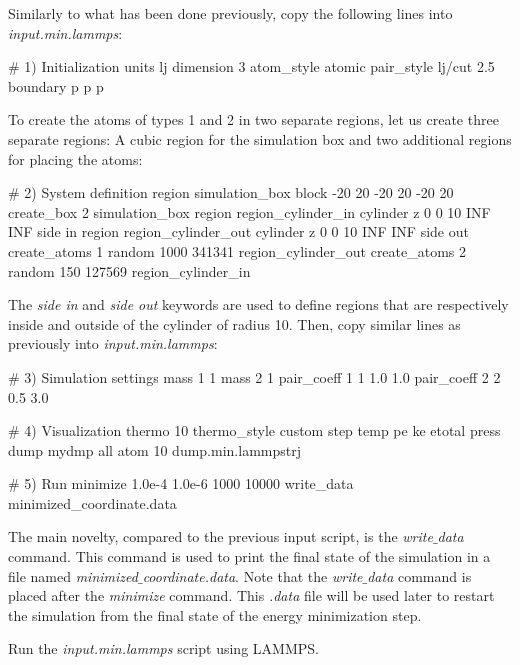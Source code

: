 \vspace{0.25cm} \noindent Similarly to what has been done previously, copy the following lines
into \textit{input.min.lammps}:

\begin{lcverbatim}
# 1) Initialization
units lj
dimension 3
atom_style atomic
pair_style lj/cut 2.5
boundary p p p
\end{lcverbatim}

\noindent To create the atoms of types 1 and 2 in two separate
regions, let us create three separate regions: A cubic region
for the simulation box and two additional regions for placing the atoms:

\begin{lcverbatim}
# 2) System definition
region simulation_box block -20 20 -20 20 -20 20
create_box 2 simulation_box
region region_cylinder_in cylinder z 0 0 10 INF INF side in
region region_cylinder_out cylinder z 0 0 10 INF INF side out
create_atoms 1 random 1000 341341 region_cylinder_out
create_atoms 2 random 150 127569 region_cylinder_in
\end{lcverbatim}

\noindent The \textit{side in} and \textit{side out} keywords
are used to define regions that are respectively inside
and outside of the cylinder of radius 10. Then, copy similar lines
as previously into \textit{input.min.lammps}:

\begin{lcverbatim}
# 3) Simulation settings
mass 1 1
mass 2 1
pair_coeff 1 1 1.0 1.0
pair_coeff 2 2 0.5 3.0

# 4) Visualization
thermo 10
thermo_style custom step temp pe ke etotal press
dump mydmp all atom 10 dump.min.lammpstrj

# 5) Run
minimize 1.0e-4 1.0e-6 1000 10000
write_data minimized_coordinate.data
\end{lcverbatim}

\noindent The main novelty, compared to the previous input script, is the \textit{write$\_$data}
command. This command is used to print the final state of the simulation in
a file named \textit{minimized$\_$coordinate.data}. Note that the \textit{write$\_$data} command
is placed after the \textit{minimize} command. This \textit{.data} file will be used later
to restart the simulation from the final state of the energy minimization step.

\vspace{0.25cm} \noindent Run the \textit{input.min.lammps} script using LAMMPS.

